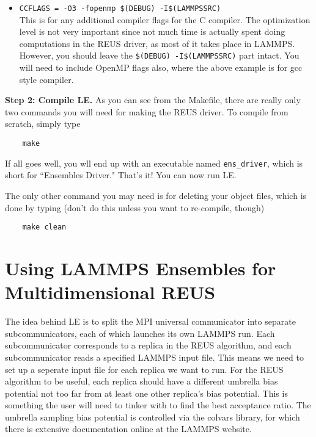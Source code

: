 \documentclass[10pt]{article}
\begin{document}
\begin{itemize}
	\item \texttt{CCFLAGS = -O3 -fopenmp \$(DEBUG) -I\$(LAMMPSSRC)}\\
			This is for any additional compiler flags for the C compiler. The optimization
			level is not very important since not much time is actually spent doing computations
			in the REUS driver, as most of it takes place in LAMMPS. However, you should
			leave the \texttt{\$(DEBUG) -I\$(LAMMPSSRC)} part intact. You will need to include
			OpenMP flags also, where the above example is for gcc style compiler.
			
\end{itemize}

\textbf{Step 2: Compile LE.} As you can see from the Makefile, there are really
only two commands you will need for making the REUS driver. To compile from scratch, simply type
\begin{verbatim}
	make
\end{verbatim}
If all goes well, you wll end up with an executable named \texttt{ens\_driver}, which is
short for ``Ensembles Driver." That's it! You can now run LE.

The only other command you may need is for deleting your object
files, which is done by typing (don't do this unless you want to re-compile, though)
\begin{verbatim}
	make clean
\end{verbatim}

\section{Using LAMMPS Ensembles for Multidimensional REUS}

The idea behind LE is to split the MPI universal communicator 
into separate subcommunicators,
each of which launches its own LAMMPS run. Each subcommunicator corresponds to a
replica in the REUS algorithm, and each subcommunicator reads a specified LAMMPS input file.
This means we need to set up a seperate input file for each replica we want to run. For the REUS
algorithm to be useful, each replica should have a different umbrella bias potential not
too far from at least one other replica's bias potential. This is something the user will need
to tinker with to find the best acceptance ratio.
The umbrella sampling bias potential is controlled via the colvars library, for which
there is extensive documentation online at the LAMMPS website.
\end{document}
